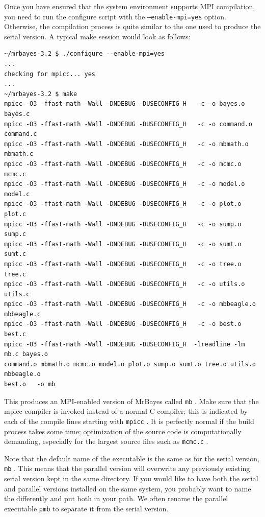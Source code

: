 \documentclass[12pt]{book}
\newcommand{\ttt}[1]{\texttt{#1} }
\begin{document}
Once you have ensured that the system environment supports MPI compilation, you need to run the
configure script with the \ttt{--enable-mpi=yes} option. Otherwise, the compilation process is
quite similar to the one used to produce the serial version. A typical make session would look as
follows:

\begin{singlespacing}
\small
\begin{verbatim}
~/mrbayes-3.2 $ ./configure --enable-mpi=yes
...
checking for mpicc... yes
...
~/mrbayes-3.2 $ make
mpicc -O3 -ffast-math -Wall -DNDEBUG -DUSECONFIG_H   -c -o bayes.o bayes.c
mpicc -O3 -ffast-math -Wall -DNDEBUG -DUSECONFIG_H   -c -o command.o command.c
mpicc -O3 -ffast-math -Wall -DNDEBUG -DUSECONFIG_H   -c -o mbmath.o mbmath.c
mpicc -O3 -ffast-math -Wall -DNDEBUG -DUSECONFIG_H   -c -o mcmc.o mcmc.c
mpicc -O3 -ffast-math -Wall -DNDEBUG -DUSECONFIG_H   -c -o model.o model.c
mpicc -O3 -ffast-math -Wall -DNDEBUG -DUSECONFIG_H   -c -o plot.o plot.c
mpicc -O3 -ffast-math -Wall -DNDEBUG -DUSECONFIG_H   -c -o sump.o sump.c
mpicc -O3 -ffast-math -Wall -DNDEBUG -DUSECONFIG_H   -c -o sumt.o sumt.c
mpicc -O3 -ffast-math -Wall -DNDEBUG -DUSECONFIG_H   -c -o tree.o tree.c
mpicc -O3 -ffast-math -Wall -DNDEBUG -DUSECONFIG_H   -c -o utils.o utils.c
mpicc -O3 -ffast-math -Wall -DNDEBUG -DUSECONFIG_H   -c -o mbbeagle.o mbbeagle.c
mpicc -O3 -ffast-math -Wall -DNDEBUG -DUSECONFIG_H   -c -o best.o best.c
mpicc -O3 -ffast-math -Wall -DNDEBUG -DUSECONFIG_H  -lreadline -lm  mb.c bayes.o
command.o mbmath.o mcmc.o model.o plot.o sump.o sumt.o tree.o utils.o mbbeagle.o
best.o   -o mb
\end{verbatim}
\normalsize
\end{singlespacing}

This produces an MPI-enabled version of MrBayes called \ttt{mb}. Make sure that the mpicc compiler
is invoked instead of a normal C compiler; this is indicated by each of the compile lines starting
with \ttt{mpicc}. It is perfectly normal if the build process takes some time; optimization of the
source code is computationally demanding, especially for the largest source files such as
\ttt{mcmc.c}.

Note that the default name of the executable is the same as for the serial version, \ttt{mb}. This
means that the parallel version will overwrite any previously existing serial version kept in the
same directory. If you would like to have both the serial and parallel versions installed on the
same system, you probably want to name the differently and put both in your path. We often rename
the parallel executable \ttt{pmb} to separate it from the serial version.
\end{document}
